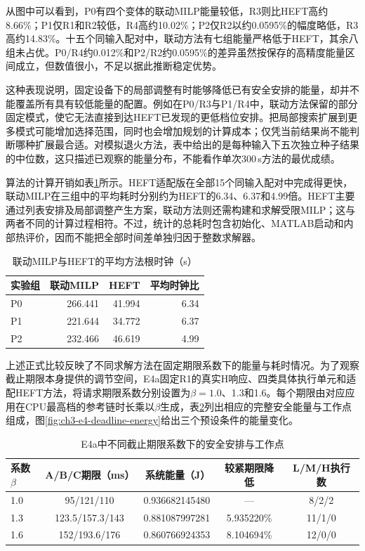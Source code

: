 
\FloatBarrier

从图中可以看到，P0有四个变体的联动MILP能量较低，R3则比HEFT高约8.66\%；P1仅R1和R2较低，R4高约10.02\%；P2仅R2以约0.0595\%的幅度略低，R3高约14.83\%。十五个同输入配对中，联动方法有七组能量严格低于HEFT，其余八组未占优。P0/R4约0.012\%和P2/R2约0.0595\%的差异虽然按保存的高精度能量区间成立，但数值很小，不足以据此推断稳定优势。

这种表现说明，固定设备下的局部调整有时能够降低已有安全安排的能量，却并不能覆盖所有具有较低能量的配置。例如在P0/R3与P1/R4中，联动方法保留的部分固定模式，使它无法直接到达HEFT已发现的更低档位安排。把局部搜索扩展到更多模式可能增加选择范围，同时也会增加规划的计算成本；仅凭当前结果尚不能判断哪种扩展最合适。对模拟退火方法，表中给出的是每种输入下五次独立种子结果的中位数，这只描述已观察的能量分布，不能看作单次300\,s方法的最优成绩。

算法的计算开销如表\ref{tab:exp-runtime}所示。HEFT适配版在全部15个同输入配对中完成得更快，联动MILP在三组中的平均耗时分别约为HEFT的6.34、6.37和4.99倍。HEFT主要通过列表安排及局部调整产生方案，联动方法则还需构建和求解受限MILP；这与两者不同的计算过程相符。不过，统计的总耗时包含初始化、MATLAB启动和内部热评价，因而不能把全部时间差单独归因于整数求解器。
\begin{table}[htbp]
\centering
\caption{联动MILP与HEFT的平均方法根时钟（s）}
\label{tab:exp-runtime}
\begin{tabular}{lrrr}
\toprule
实验组 & 联动MILP & HEFT & 平均时钟比 \\
\midrule
P0 & 266.441 & 41.994 & 6.34 \\
P1 & 221.644 & 34.772 & 6.37 \\
P2 & 232.466 & 46.619 & 4.99 \\
\bottomrule
\end{tabular}
\end{table}

上述正式比较反映了不同求解方法在固定期限系数下的能量与耗时情况。为了观察截止期限本身提供的调节空间，E4a固定R1的真实H响应、四类具体执行单元和适配HEFT方法，将请求期限系数分别设置为$\beta=1.0$、1.3和1.6。每个期限由对应应用在CPU最高档的参考链时长乘以$\beta$生成，表\ref{tab:exp-e4-deadlines}列出相应的完整安全能量与工作点组成，图\ref{fig:ch3-e4-deadline-energy}给出三个预设条件的能量变化。

\begin{table}[htbp]
\centering
\small
\caption{E4a中不同截止期限系数下的安全安排与工作点}
\label{tab:exp-e4-deadlines}
\begin{tabular}{lcrcc}
\toprule
系数$\beta$ & A/B/C期限（ms） & 系统能量（J） & 较紧期限降低 & L/M/H执行数 \\
\midrule
1.0 & 95/121/110 & 0.936682145480 & --- & 8/2/2 \\
1.3 & 123.5/157.3/143 & 0.881087997281 & 5.935220\% & 11/1/0 \\
1.6 & 152/193.6/176 & 0.860766924353 & 8.104694\% & 12/0/0 \\
\bottomrule
\end{tabular}
\end{table}

